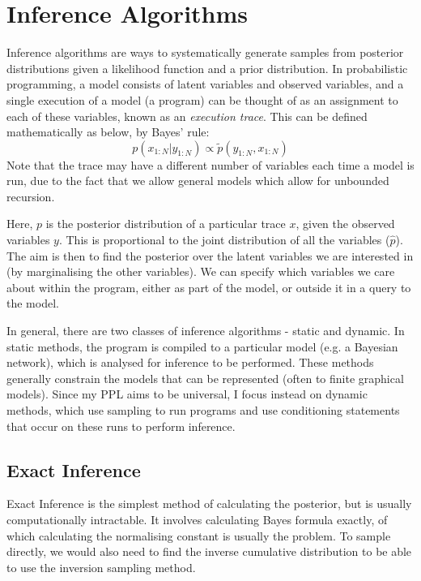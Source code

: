 \section{Inference Algorithms}
	
Inference algorithms are ways to systematically generate samples from posterior distributions given a likelihood function and a prior distribution. In probabilistic programming, a model consists of latent variables and observed variables, and a single execution of a model (a program) can be thought of as an assignment to each of these variables, known as an \textit{execution trace}. This can be defined mathematically as below, by Bayes' rule:
% 
\[p(x_{1:N}|y_{1:N})\propto \tilde{p}(y_{1:N},x_{1:N})\]
% 
Note that the trace may have a different number of variables each time a model is run, due to the fact that we allow general models which allow for unbounded recursion. 

Here, $p$ is the posterior distribution of a particular trace $x$, given the observed variables $y$. This is proportional to the joint distribution of all the variables ($\hat{p}$). The aim is then to find the posterior over the latent variables we are interested in (by marginalising the other variables). We can specify which variables we care about within the program, either as part of the model, or outside it in a query to the model.
	
In general, there are two classes of inference algorithms - static and dynamic\cite{gordon2014probabilistic}. In static methods, the program is compiled to a particular model (e.g. a Bayesian network), which is analysed for inference to be performed. These methods generally constrain the models that can be represented (often to finite graphical models). Since my PPL aims to be universal, I focus instead on dynamic methods, which use sampling to run programs and use conditioning statements that occur on these runs to perform inference.
	
\subsection{Exact Inference}
	
Exact Inference is the simplest method of calculating the posterior, but is usually computationally intractable. It involves calculating Bayes formula exactly, of which calculating the normalising constant is usually the problem. To sample directly, we would also need to find the inverse cumulative distribution to be able to use the inversion sampling method.
	
